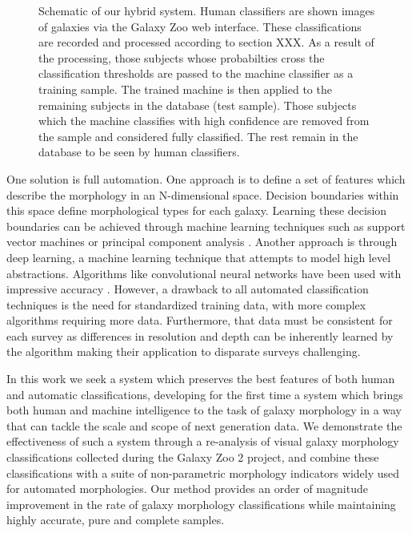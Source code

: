 \documentclass[twocolumn]{aastex6}
\begin{document}
\begin{figure}[ht!]
\caption{Schematic of our hybrid system. Human classifiers are shown images of galaxies via the Galaxy Zoo web interface. These  classifications are recorded and processed according to section XXX. As a result of the processing, those subjects whose probabilties cross the classification thresholds are passed to the machine classifier as a training sample. The trained machine is then applied to the remaining subjects in the database (test sample). Those subjects which the machine classifies with high confidence are removed from the sample and considered fully classified. The rest remain in the database to be seen by human classifiers. \label{fig: schematic}}
\end{figure}

One solution is full automation. One approach is to define a set of features which describe the morphology in an N-dimensional space. Decision boundaries within this space define morphological types for each galaxy. Learning these decision boundaries can be achieved through machine learning techniques such as support vector machines \citep{HuertasCompany2008} or principal component analysis \citep{Scarlata2007}.  Another approach is through deep learning, a machine learning technique that attempts to model high level abstractions. Algorithms like convolutional neural networks have been used with impressive accuracy \citep{Dieleman2015, HuertasCompany2015}. However, a drawback to all automated classification techniques is the need for standardized training data, with more complex algorithms requiring more data. Furthermore, that data must be consistent for each survey as differences in resolution and depth can be inherently learned by the algorithm making their application to disparate surveys challenging.  


In this work we seek a system which preserves the best features of both human and automatic classifications, developing for the first time a system which brings both human and machine intelligence to the task of galaxy morphology in a way that can tackle the scale and scope of next generation data. We demonstrate the effectiveness of such a system through a 
re-analysis of visual galaxy morphology classifications collected during the Galaxy Zoo 2
project, and combine these classifications with a suite of non-parametric 
morphology indicators widely used for automated morphologies. Our method 
provides an order of magnitude improvement in the rate of galaxy morphology 
classifications while maintaining highly accurate, pure and complete samples.
\end{document}
